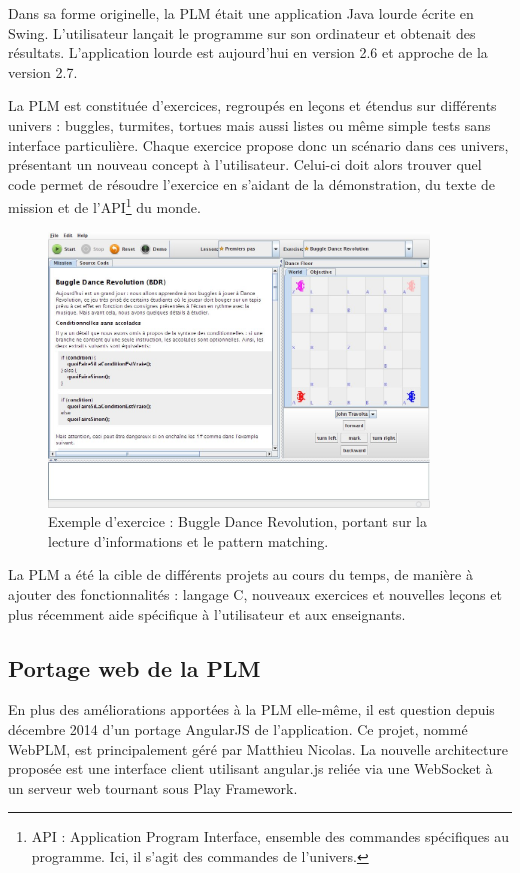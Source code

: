 \documentclass[stage]{tnreport}
\begin{document}
Dans sa forme originelle, la PLM était une application Java lourde écrite en Swing. L'utilisateur lançait le programme sur son ordinateur et obtenait des résultats. L'application lourde est aujourd'hui en version 2.6 et approche de la version 2.7.

La PLM est constituée d'exercices, regroupés en leçons et étendus sur différents univers : buggles, turmites, tortues mais aussi listes ou même simple tests sans interface particulière. Chaque exercice propose donc un scénario dans ces univers, présentant un nouveau concept à l'utilisateur.
Celui-ci doit alors trouver quel code permet de résoudre l'exercice en s'aidant de la démonstration, du texte de mission et de l'API\footnote{API : Application Program Interface, ensemble des commandes spécifiques au programme. Ici, il s'agit des commandes de l'univers.} du monde.
\begin{figure}[h]
	\centering
		\includegraphics[width=0.9\textwidth]{figures/PLM-exercice1}
	\caption{Exemple d'exercice : Buggle Dance Revolution, portant sur la lecture d'informations et le pattern matching.}
	\label{fig:plmEx1}
\end{figure}

La PLM a été la cible de différents projets au cours du temps, de manière à ajouter des fonctionnalités : langage C, nouveaux exercices et nouvelles leçons et plus récemment aide spécifique à l'utilisateur et aux enseignants.

\subsection{Portage web de la PLM}

En plus des améliorations apportées à la PLM elle-même, il est question depuis décembre 2014 d'un portage AngularJS de l'application. Ce projet, nommé WebPLM, est principalement géré par Matthieu Nicolas.
La nouvelle architecture proposée est une interface client utilisant angular.js reliée via une WebSocket à un serveur web tournant sous Play Framework.
\end{document}
